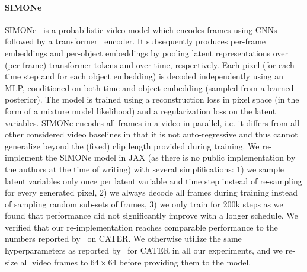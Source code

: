 \documentclass{article}
\begin{document}
\paragraph{SIMONe}
SIMONe~\citep{kabra2021simone} is a probabilistic video model which encodes frames using CNNs followed by a transformer~\citep{vaswani2017attention} encoder. It subsequently produces per-frame embeddings and per-object embeddings by pooling latent representations over (per-frame) transformer tokens and over time, respectively. Each pixel (for each time step and for each object embedding) is decoded independently using an MLP, conditioned on both time and object embedding (sampled from a learned posterior). The model is trained using a reconstruction loss in pixel space (in the form of a mixture model likelihood) and a regularization loss on the latent variables. SIMONe encodes all frames in a video in parallel, i.e. it differs from all other considered video baselines in that it is not auto-regressive and thus cannot generalize beyond the (fixed) clip length provided during training. We re-implement the SIMONe model in JAX (as there is no public implementation by the authors at the time of writing) with several simplifications: 1) we sample latent variables only once per latent variable and time step instead of re-sampling for every generated pixel, 2) we always decode all frames during training instead of sampling random sub-sets of frames, 3) we only train for 200k steps as we found that performance did not significantly improve with a longer schedule. We verified that our re-implementation reaches comparable performance to the numbers reported by~\citet{kabra2021simone} on CATER. We otherwise utilize the same hyperparameters as reported by~\citet{kabra2021simone} for CATER in all our experiments, and we re-size all video frames to $64\times64$ before providing them to the model.
\end{document}
